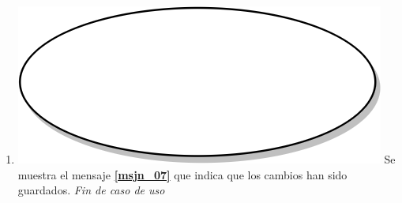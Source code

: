 \begin{enumerate}
  \item {\includegraphics[scale=.05]{Capitulo3/img/proceso.png} Se muestra el mensaje \textbf{\ref{msjn_07}} que indica que los cambios han sido guardados.}
  \textit{Fin de caso de uso} \\  
\end{enumerate}


